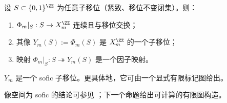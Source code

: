 \begin{proposition}\label{prop:Phi_m-factor-on-subshift}
设 $S\subset\{0,1\}^{\ZZ}$ 为任意子移位（紧致、移位不变闭集）。则：
\begin{enumerate}
  \item $\Phi_m|_S:S\to X_m^{\ZZ}$ 连续且与移位交换；
  \item 其像 $Y_m(S):=\Phi_m(S)$ 是 $X_m^{\ZZ}$ 的一个子移位；
  \item 映射 $\Phi_m|_S:S\twoheadrightarrow Y_m(S)$ 是一个因子映射。
\end{enumerate}
\end{proposition}

\begin{proposition}\label{prop:Y_m-sofic}
$Y_m$ 是一个 sofic 子移位。更具体地，它可由一个显式有限标记图给出。
\end{proposition}
像空间为 sofic 的结论可参见 \cite{LindMarcus1995}；下一个命题给出可计算的有限图构造。
